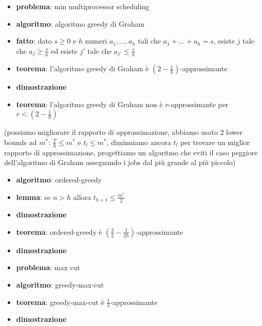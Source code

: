     \begin{itemize}

\item
  \textbf{problema}: min multiprocessor scheduling
\item
  \textbf{algoritmo}: algoritmo greedy di Graham
\item
  \textbf{fatto}: dato \(s \geq 0\) e \(h\) numeri \(a_1, \dots, a_h\)
  tali che \(a_1 + \dots + a_h = s\), esiste \(j\) tale che
  \(a_j \geq {\frac{s}{h}}\) ed esiste \(j'\) tale che
  \(a_{j'} \leq {\frac{s}{h}}\)
\item
  \textbf{teorema}: l'algoritmo greedy di Graham è
  \((2 - {\frac{1}{h}})\)-approssimante
\item
  \textbf{dimostrazione}
\item
  \textbf{teorema}: l'algoritmo greedy di Graham non è
  \(r\)-approssimante per \(r < (2 - {\frac{1}{h}})\)
\end{itemize}

(possiamo migliorare il rapporto di approssimazione, abbiamo usato 2
lower bounds ad \(m^*\): \({\frac{T}{h}} \leq m^*\) e \(t_l \leq m^*\),
diminuiamo ancora \(t_l\) per trovare un miglior rapporto di
approssimazione, progettiamo un algoritmo che eviti il caso peggiore
dell'algoritmo di Graham assegnando i jobs dal più grande al più
piccolo)

\begin{itemize}

\item
  \textbf{algoritmo}: ordered-greedy
\item
	\textbf{lemma}: se \(n > h\) allora \(t_{h+1} \leq {\frac{m^*}{2}}\)
\item
  \textbf{dimostrazione}
\item
  \textbf{teorema}: ordered-greedy è
  \(({\frac{3}{2}} - {\frac{1}{2h}})\)-approssimante
\item
  \textbf{dimostrazione}
\end{itemize}

    \begin{itemize}

\item
  \textbf{problema}: max cut
\item
  \textbf{algoritmo}: greedy-max-cut
\item
	\textbf{teorema}: greedy-max-cut è \({\frac{1}{2}}\)-approssimante
\item
  \textbf{dimostrazione}
\end{itemize}

